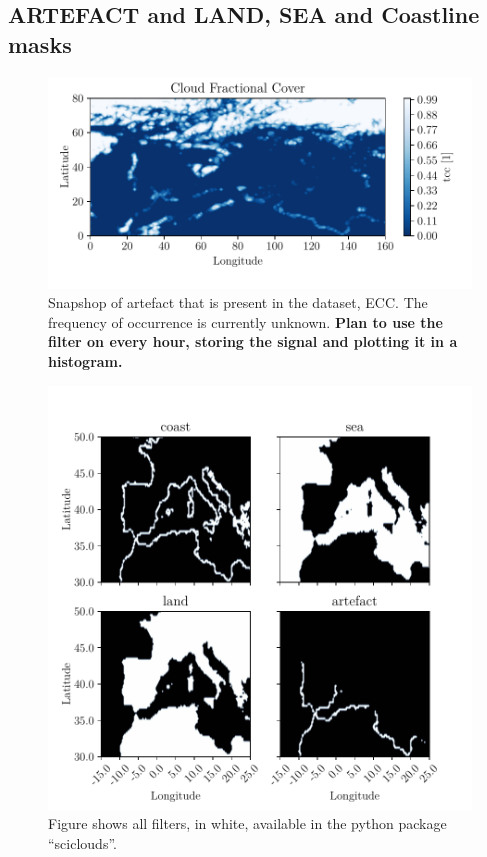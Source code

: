 \subsection{ARTEFACT and LAND, SEA and Coastline masks} \label{sec:artefact}
\begin{figure}
    \centering
    \includegraphics{python_figs/example_artefact.pdf}
    \caption[Artefact in European Cloud Cover dataset.]{Snapshop of artefact that is present in the dataset, ECC. The frequency of occurrence is currently unknown. \textbf{Plan to use the filter on every hour, storing the signal and plotting it in a histogram.}}
    \label{fig:example_artefact}
\end{figure}
\begin{figure}
    \centering
    \includegraphics{python_figs/filters.pdf}
    \caption{Figure shows all filters, in white, available in the python package ``sciclouds''.}
    \label{fig:filters_subplot}
\end{figure}
